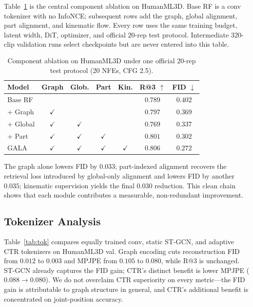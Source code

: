 \documentclass[journal]{IEEEtran}
\begin{document}
Table~\ref{tab:ablate} is the central component ablation on HumanML3D. Base RF is a conv tokenizer with no InfoNCE; subsequent rows add the graph, global alignment, part alignment, and kinematic flow. Every row uses the same training budget, latent width, DiT, optimizer, and official 20-rep test protocol. Intermediate 320-clip validation runs select checkpoints but are never entered into this table.

\begin{table}[t]
\centering
\caption{Component ablation on HumanML3D under one official 20-rep test protocol (20 NFEs, CFG 2.5).}
\label{tab:ablate}
\small
\setlength{\tabcolsep}{2.6pt}
\begin{tabular}{@{}lcccccc@{}}
\toprule
Model & Graph & Glob. & Part & Kin. & R@3 $\uparrow$ & FID $\downarrow$ \\
\midrule
Base RF & & & & & $0.789$ & $0.402$ \\
$+$ Graph & $\checkmark$ & & & & $0.797$ & $0.369$ \\
$+$ Global & $\checkmark$ & $\checkmark$ & & & $0.769$ & $0.337$ \\
$+$ Part & $\checkmark$ & $\checkmark$ & $\checkmark$ & & $0.801$ & $0.302$ \\
GALA & $\checkmark$ & $\checkmark$ & $\checkmark$ & $\checkmark$ & $\mathbf{0.806}$ & $\mathbf{0.272}$ \\
\bottomrule
\end{tabular}
\end{table}

The graph alone lowers FID by $0.033$; part-indexed alignment recovers the retrieval loss introduced by global-only alignment and lowers FID by another $0.035$; kinematic supervision yields the final $0.030$ reduction. This clean chain shows that each module contributes a measurable, non-redundant improvement.

\subsection{Tokenizer Analysis}
\label{sec:tok}

Table~\ref{tab:tok} compares equally trained conv, static ST-GCN, and adaptive CTR tokenizers on HumanML3D val. Graph encoding cuts reconstruction FID from $0.012$ to $0.003$ and MPJPE from $0.105$ to $0.080$, while R@3 is unchanged. ST-GCN already captures the FID gain; CTR's distinct benefit is lower MPJPE ($0.088\to0.080$). We do not overclaim CTR superiority on every metric---the FID gain is attributable to graph structure in general, and CTR's additional benefit is concentrated on joint-position accuracy.
\end{document}
